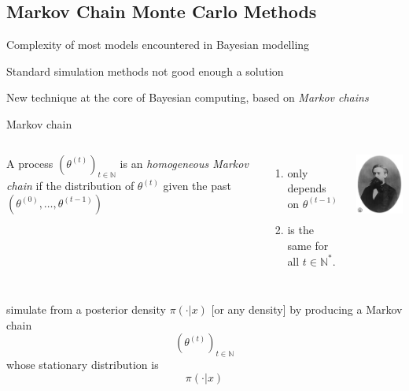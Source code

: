 \subsection{Markov Chain Monte Carlo Methods}
\begin{slide}

Complexity of most models encountered in Bayesian modelling

\pause
\vs Standard simulation methods not good enough a solution

\pause
\vs New technique at the core of Bayesian computing,
based on {\em Markov chains}

\end{slide}\begin{slide}

\begin{block}{Markov chain}
\begin{columns}
A process $(\theta^{(t)})_{t\in\mathbb{N}}$ is an \emph{homogeneous Markov chain}
if the distribution of $\theta^{(t)}$ given the past $(\theta^{(0)},\ldots,\theta^{(t-1)})$ 
\begin{enumerate}
\item only depends on $\theta^{(t-1)}$
\item is the same for all $t\in\mathbb{N}^*$. 
\end{enumerate}
\includegraphics[width=3truecm]{figures/Markov.eps}
\end{columns}
\end{block}

\end{slide}\begin{slide}

 simulate from a posterior density $\pi(\cdot|x)$ [or any density]
by producing a Markov chain 
$$
(\theta^{(t)})_{t\in\mathbb{N}}
$$
whose stationary distribution is 
$$
\pi(\cdot|x)
$$


\end{slide}
